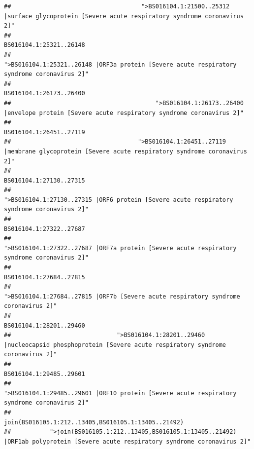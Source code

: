 \documentclass[
]{article}
\begin{document}
\begin{verbatim}
##                                     ">BS016104.1:21500..25312 |surface glycoprotein [Severe acute respiratory syndrome coronavirus 2]" 
##                                                                                                                BS016104.1:25321..26148 
##                                            ">BS016104.1:25321..26148 |ORF3a protein [Severe acute respiratory syndrome coronavirus 2]" 
##                                                                                                                BS016104.1:26173..26400 
##                                         ">BS016104.1:26173..26400 |envelope protein [Severe acute respiratory syndrome coronavirus 2]" 
##                                                                                                                BS016104.1:26451..27119 
##                                    ">BS016104.1:26451..27119 |membrane glycoprotein [Severe acute respiratory syndrome coronavirus 2]" 
##                                                                                                                BS016104.1:27130..27315 
##                                             ">BS016104.1:27130..27315 |ORF6 protein [Severe acute respiratory syndrome coronavirus 2]" 
##                                                                                                                BS016104.1:27322..27687 
##                                            ">BS016104.1:27322..27687 |ORF7a protein [Severe acute respiratory syndrome coronavirus 2]" 
##                                                                                                                BS016104.1:27684..27815 
##                                                    ">BS016104.1:27684..27815 |ORF7b [Severe acute respiratory syndrome coronavirus 2]" 
##                                                                                                                BS016104.1:28201..29460 
##                              ">BS016104.1:28201..29460 |nucleocapsid phosphoprotein [Severe acute respiratory syndrome coronavirus 2]" 
##                                                                                                                BS016104.1:29485..29601 
##                                            ">BS016104.1:29485..29601 |ORF10 protein [Severe acute respiratory syndrome coronavirus 2]" 
##                                                                                    join(BS016105.1:212..13405,BS016105.1:13405..21492) 
##           ">join(BS016105.1:212..13405,BS016105.1:13405..21492) |ORF1ab polyprotein [Severe acute respiratory syndrome coronavirus 2]" 

\end{verbatim}
\end{document}
